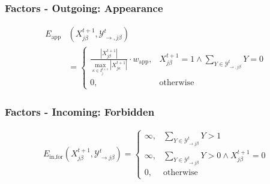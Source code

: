 \begin{frame}[plain]
    \frametitle{Factors - Outgoing: Appearance}
    \begin{align*}
        E_{\text{app}}&(X_{j\beta}^{t+1}, \mathcal{Y}_{\rightarrow, j\beta}^t) \\ \nonumber
        &=
        \begin{cases}
            \frac{|X_{j\beta}^{t+1}|} {\max_{\kappa \in I_j^{t+1}}|X_{j\kappa}^{t+1}|} \cdot w_{\mathrm{app}}, & X_{j\beta}^{t+1} = 1 \wedge \sum_{Y\in\mathcal{Y}_{\rightarrow, j\beta}^t}Y = 0 \\
            0, & \mathrm{otherwise}
        \end{cases}    
    \end{align*}
\end{frame}


\begin{frame}[plain]
    \frametitle{Factors - Incoming: Forbidden}
    \begin{align*}
        E_{\text{in,for}}(X_{j\beta}^{t+1},  \mathcal{Y}_{\rightarrow j\beta}^{t})=
        \begin{cases}
        \infty, & \sum_{Y \in \mathcal{Y}_{\rightarrow j\beta}^{t}}Y >
        1 \\
        \infty, & \sum_{Y \in \mathcal{Y}_{\rightarrow j\beta}^{t}}Y > 0 \wedge X_{j\beta}^{t+1} =
        0 \\
        0, & \text{otherwise}
        \end{cases}
    \end{align*}
\end{frame}


